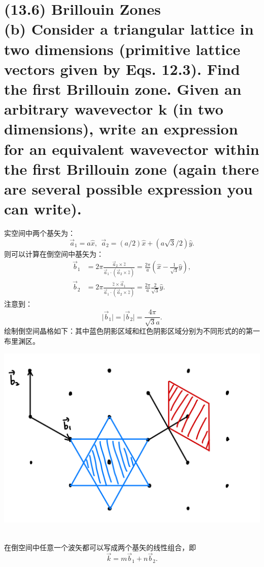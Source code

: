 \documentclass[reqno,a4paper,12pt]{amsart}
\begin{document}
\section{\textbf{(13.6) Brillouin Zones} \\
(b) Consider a triangular lattice in two dimensions (primitive lattice vectors given by Eqs. 12.3). Find the first Brillouin zone. Given an arbitrary wavevector $\mathbf{k}$ (in two dimensions), write an expression for an equivalent wavevector within the first Brillouin zone (again there are several possible expression you can write).
}
\begin{tcolorbox}[breakable, colback = black!5!white, colframe = black]
实空间中两个基矢为：
\[
	\vec{a}_1 = a\hat{x}, ~~ \vec{a}_2 = (a/2)\hat{x} + (a\sqrt{3}/2)\hat{y}.
\]
则可以计算在倒空间中基矢为：
\begin{align*}
	\vec{b}_1 &= 2\pi \frac{\vec{a}_2 \times \hat{z}}{\vec{a}_1\cdot (\vec{a}_2 \times \hat{z})} = \frac{2\pi}{a} \left( \hat{x} - \frac{1}{\sqrt{3}}\hat{y} \right), \\
	\vec{b}_2 &= 2\pi \frac{\hat{z} \times \vec{a}_1}{\vec{a}_1\cdot (\vec{a}_2 \times \hat{z})} = \frac{2\pi}{a} \frac{2}{\sqrt{3}}\hat{y}.
\end{align*}
注意到：
\[
	\vert \vec{b}_1 \vert = \vert \vec{b}_2 \vert = \frac{4\pi}{\sqrt{3}a}.
\]
绘制倒空间晶格如下：其中蓝色阴影区域和红色阴影区域分别为不同形式的的第一布里渊区。 \\
\begin{centering}
	\includegraphics[scale = 0.14]{13.6.jpeg}
\end{centering} \\
在倒空间中任意一个波矢都可以写成两个基矢的线性组合，即
\[
	\vec{k} = m \vec{b}_1 + n \vec{b}_2.
\]
\end{tcolorbox}
\end{document}
